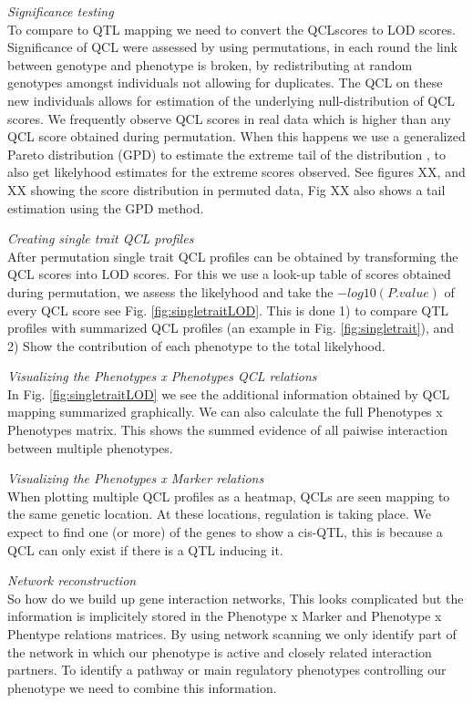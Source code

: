 \documentclass[12pt]{article}
\begin{document}
\emph{\sffamily Significance testing}\\
  To compare to QTL mapping we need to convert the QCLscores to LOD scores. Significance 
  of QCL were assessed by using permutations, in each round the link between genotype and 
  phenotype is broken, by redistributing at random genotypes amongst individuals not 
  allowing for duplicates. The QCL on these new individuals allows for estimation of 
  the underlying null-distribution of QCL scores. We frequently observe QCL scores in 
  real data which is higher than any QCL score obtained during permutation. When this 
  happens we use a generalized Pareto distribution (GPD) to estimate the extreme tail 
  of the distribution \cite{Knijnenburg:2009}, to also get likelyhood estimates for the 
  extreme scores observed. See figures XX, and XX showing the score distribution in 
  permuted data, Fig XX also shows a tail estimation using the GPD method.

\emph{\sffamily Creating single trait QCL profiles}\\
  After permutation single trait QCL profiles can be obtained by transforming the QCL scores 
  into LOD scores. For this we use a look-up table of scores obtained during permutation, we 
  assess the likelyhood and take the $-log10(P.value)$ of every QCL score see Fig. 
  \ref{fig:singletraitLOD}. This is done 1) to compare QTL profiles with summarized QCL profiles 
  (an example in Fig. \ref{fig:singletrait}), and 2) Show the contribution of each phenotype 
  to the total likelyhood.

\emph{\sffamily Visualizing the Phenotypes x Phenotypes QCL relations}\\
  In Fig. \ref{fig:singletraitLOD} we see the additional information obtained by QCL mapping summarized 
  graphically.  We can also calculate the full Phenotypes x Phenotypes matrix. This shows the summed 
  evidence of all paiwise interaction between multiple phenotypes.

\emph{\sffamily Visualizing the Phenotypes x Marker relations}\\
  When plotting multiple QCL profiles as a heatmap, QCLs are seen mapping to the 
  same genetic location. At these locations, regulation is taking place. We expect 
  to find one (or more) of the genes to show a cis-QTL, this is because a QCL can 
  only exist if there is a QTL inducing it.

\emph{\sffamily Network reconstruction}\\
  So how do we build up gene interaction networks, This looks complicated but the information 
  is implicitely stored in the Phenotype x Marker and Phenotype x Phentype relations matrices. 
  By using network scanning we only identify part of the network in which our phenotype is 
  active and closely related interaction partners. To identify a pathway or main regulatory phenotypes 
  controlling our phenotype we need to combine this information.
\end{document}
